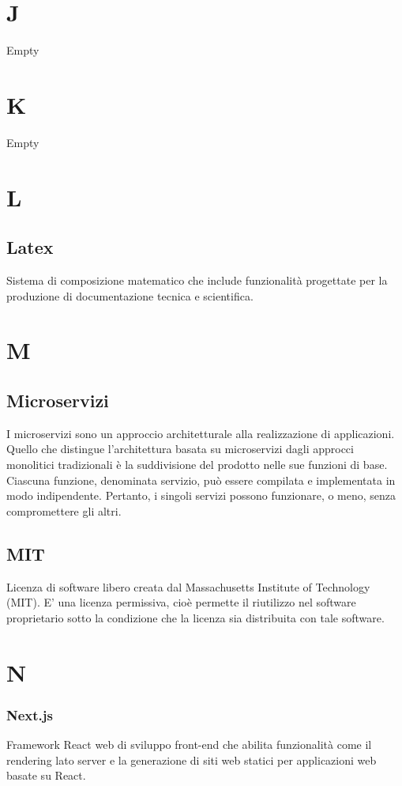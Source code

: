 \section*{J}
Empty

\section*{K}
Empty

\section*{L}
\subsection*{Latex}
Sistema di composizione matematico che include funzionalità progettate per la produzione di documentazione tecnica e scientifica.

\section*{M}
\subsection*{Microservizi}
I microservizi sono un approccio architetturale alla realizzazione di applicazioni. 
Quello che distingue l'architettura basata su microservizi dagli approcci monolitici tradizionali 
è la suddivisione del prodotto nelle sue funzioni di base. Ciascuna funzione, denominata servizio, può essere 
compilata e implementata in modo indipendente. Pertanto, i singoli servizi possono funzionare, o meno, senza compromettere gli altri.

\subsection*{MIT}
Licenza di software libero creata dal Massachusetts Institute of Technology (MIT).
E' una licenza permissiva, cioè permette il riutilizzo nel software proprietario sotto la condizione che la licenza sia distribuita con tale software.

\section*{N}

\subsubsection*{Next.js}
Framework React web di sviluppo front-end che abilita funzionalità come il rendering lato server e la generazione di siti web statici per applicazioni web basate su React.

